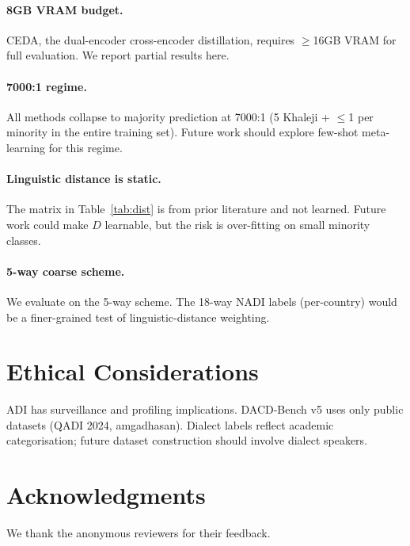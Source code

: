\documentclass[11pt,a4paper,twocolumn]{article}
\newcommand{\bench}{DACD-Bench}
\begin{document}
\paragraph{8GB VRAM budget.}
CEDA, the dual-encoder cross-encoder distillation, requires
$\ge$16GB VRAM for full evaluation. We report partial results
here.

\paragraph{7000:1 regime.}
All methods collapse to majority prediction at 7000:1 (5 Khaleji
+ $\le$1 per minority in the entire training set). Future
work should explore few-shot meta-learning for this regime.

\paragraph{Linguistic distance is static.}
The matrix in Table~\ref{tab:dist} is from prior literature
and not learned. Future work could make $D$ learnable, but
the risk is over-fitting on small minority classes.

\paragraph{5-way coarse scheme.}
We evaluate on the 5-way scheme. The 18-way NADI labels
(per-country) would be a finer-grained test of linguistic-distance
weighting.

\section{Ethical Considerations}
ADI has surveillance and profiling implications. \bench{} v5 uses
only public datasets (QADI 2024, amgadhasan). Dialect labels
reflect academic categorisation; future dataset construction
should involve dialect speakers.

\section*{Acknowledgments}
We thank the anonymous reviewers for their feedback.



\end{document}
